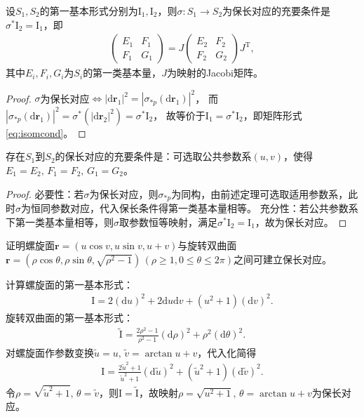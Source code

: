 \documentclass[../../main.tex]{subfiles}%
\begin{document}
\begin{theorem}
设$S_1,S_2$的第一基本形式分别为$\mathrm{I}_1,\mathrm{I}_2$，则$\sigma:S_1\to S_2$为保长对应的充要条件是$\sigma^*\mathrm{I}_2=\mathrm{I}_1$，即
\begin{align}
\begin{pmatrix}E_1&F_1\\F_1&G_1\end{pmatrix}=J\begin{pmatrix}E_2&F_2\\F_2&G_2\end{pmatrix}J^\mathrm{T},\label{eq:isomcond}
\end{align}
其中$E_i,F_i,G_i$为$S_i$的第一类基本量，$J$为映射的Jacobi矩阵。
\end{theorem}
\begin{proof}
$\sigma$为保长对应$\iff|\mathrm{d}\boldsymbol{r}_1|^2=|\sigma_{*p}(\mathrm{d}\boldsymbol{r}_1)|^2$，
而$|\sigma_{*p}(\mathrm{d}\boldsymbol{r}_1)|^2=\sigma^*(|\mathrm{d}\boldsymbol{r}_2|^2)=\sigma^*\mathrm{I}_2$，
故等价于$\mathrm{I}_1=\sigma^*\mathrm{I}_2$，即矩阵形式\eqref{eq:isomcond}。
\end{proof}

\begin{theorem}
存在$S_1$到$S_2$的保长对应的充要条件是：可选取公共参数系$(u,v)$，使得$E_1=E_2,\,F_1=F_2,\,G_1=G_2$。
\end{theorem}
\begin{proof}
必要性：若$\sigma$为保长对应，则$\sigma_{*p}$为同构，由前述定理可选取适用参数系，此时$\sigma$为恒同参数对应，代入保长条件得第一类基本量相等。
充分性：若公共参数系下第一类基本量相等，则$\sigma$取参数恒等映射，满足$\sigma^*\mathrm{I}_2=\mathrm{I}_1$，故为保长对应。
\end{proof}

\begin{example}
证明螺旋面$\boldsymbol{r}=(u\cos v,u\sin v,u+v)$与旋转双曲面$\boldsymbol{r}=(\rho\cos\theta,\rho\sin\theta,\sqrt{\rho^2-1})\,(\rho\geqslant1,0\leqslant\theta\leqslant2\pi)$之间可建立保长对应。\begin{solution}
计算螺旋面的第一基本形式：
\begin{align*}
\mathrm{I}=2(\mathrm{d}u)^2+2\mathrm{d}u\mathrm{d}v+(u^2+1)(\mathrm{d}v)^2.
\end{align*}
旋转双曲面的第一基本形式：
\begin{align*}
\tilde{\mathrm{I}}=\frac{2\rho^2-1}{\rho^2-1}(\mathrm{d}\rho)^2+\rho^2(\mathrm{d}\theta)^2.
\end{align*}
对螺旋面作参数变换$\tilde{u}=u,\,\tilde{v}=\arctan u+v$，代入化简得
\begin{align*}
\mathrm{I}=\frac{2\tilde{u}^2+1}{\tilde{u}^2+1}(\mathrm{d}\tilde{u})^2+(\tilde{u}^2+1)(\mathrm{d}\tilde{v})^2.
\end{align*}
令$\rho=\sqrt{\tilde{u}^2+1},\,\theta=\tilde{v}$，则$\mathrm{I}=\tilde{\mathrm{I}}$，故映射$\rho=\sqrt{u^2+1},\,\theta=\arctan u+v$为保长对应。

\end{solution}
\end{example}
\end{document}
